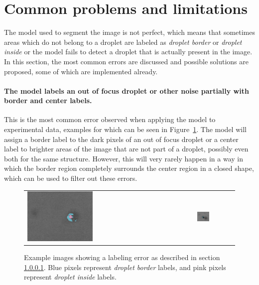 \section{Common problems and limitations}
\label{sec:limitations}

The model used to segment the image is not perfect, which means that sometimes areas which do not belong to a droplet are labeled as \emph{droplet border} or \emph{droplet inside} or the model fails to detect a droplet that is actually present in the image.
In this section, the most common errors are discussed and possible solutions are proposed, some of which are implemented already.

\paragraph{The model labels an out of focus droplet or other noise partially with border and center labels.}
\label{sec:partially_wrong}
This is the most common error observed when applying the model to experimental data, examples for which can be seen in Figure~\ref{fig:partially_wrong}.
The model will assign a border label to the dark pixels of an out of focus droplet or a center label to brighter areas of the image that are not part of a droplet, possibly even both for the same structure.
However, this will very rarely happen in a way in which the border region completely surrounds the center region in a closed shape, which can be used to filter out these errors.

\begin{figure}[htbp]
    \centering
    \begin{tabular}{ll}
        \includegraphics[width=0.4\textwidth]{images/bad1.png}
        &
        \includegraphics[width=0.35\textwidth]{images/bad2.png}
    \end{tabular}
    \caption{Example images showing a labeling error as described in section \ref{sec:partially_wrong}. Blue pixels represent \emph{droplet border} labels, and pink pixels represent \emph{droplet inside} labels.}
    \label{fig:partially_wrong}
\end{figure}

